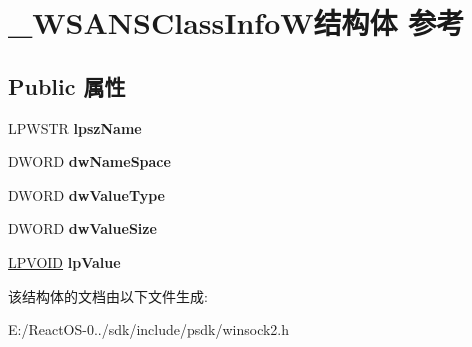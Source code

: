 \hypertarget{struct___w_s_a_n_s_class_info_w}{}\section{\+\_\+\+W\+S\+A\+N\+S\+Class\+Info\+W结构体 参考}
\label{struct___w_s_a_n_s_class_info_w}
\subsection*{Public 属性}
\begin{DoxyCompactItemize}
\item 
\mbox{\label{struct___w_s_a_n_s_class_info_w_a7141461d2a3b052ea9751b49eaa10f1d}} 
L\+P\+W\+S\+TR {\bfseries lpsz\+Name}
\item 
\mbox{\label{struct___w_s_a_n_s_class_info_w_aeec6e9d56bd4060d2a13dfd657a4bc5b}} 
D\+W\+O\+RD {\bfseries dw\+Name\+Space}
\item 
\mbox{\label{struct___w_s_a_n_s_class_info_w_ad61ec5baeddf9e14a095246f2ab1f45f}} 
D\+W\+O\+RD {\bfseries dw\+Value\+Type}
\item 
\mbox{\label{struct___w_s_a_n_s_class_info_w_acc4115d126faf6cfd10e57a2436df42f}} 
D\+W\+O\+RD {\bfseries dw\+Value\+Size}
\item 
\mbox{\label{struct___w_s_a_n_s_class_info_w_abf8a695317b492c3bab2fb1e399cd284}} 
\hyperlink{interfacevoid}{L\+P\+V\+O\+ID} {\bfseries lp\+Value}
\end{DoxyCompactItemize}


该结构体的文档由以下文件生成\+:\begin{DoxyCompactItemize}
\item 
E\+:/\+React\+O\+S-\/0../sdk/include/psdk/winsock2.\+h\end{DoxyCompactItemize}
